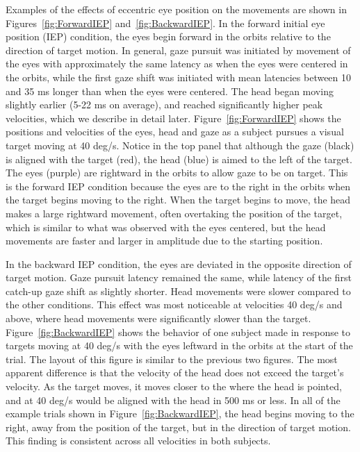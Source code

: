 \documentclass[12pt]{article}
\begin{document}
Examples of the effects of eccentric eye position on the movements are shown in Figures~\ref{fig:ForwardIEP} and~\ref{fig:BackwardIEP}. In the forward initial eye position (IEP) condition, the eyes begin forward in the orbits relative to the direction of target motion. In general, gaze pursuit was initiated by movement of the eyes with approximately the same latency as when the eyes were centered in the orbits, while the first gaze shift was initiated with mean latencies between 10 and 35 ms longer than when the eyes were centered. The head began moving slightly earlier (5-22 ms on average), and reached significantly higher peak velocities, which we describe in detail later. Figure~\ref{fig:ForwardIEP} shows the positions and velocities of the eyes, head and gaze as a subject pursues a visual target moving at 40 deg/s. Notice  in the top panel that although the gaze (black) is aligned with the target (red), the head (blue) is aimed to the left of the target. The eyes (purple) are rightward in the orbits to allow gaze to be on target. This is the forward IEP condition because the eyes are to the right in the orbits when the target begins moving to the right. When the target begins to move, the head makes a large rightward movement, often overtaking the position of the target, which is similar to what was observed with the eyes centered, but the head movements are faster and larger in amplitude due to the starting position.  

In the backward IEP condition, the eyes are deviated in the opposite direction of target motion.  Gaze pursuit latency remained the same, while latency of the first catch-up gaze shift as slightly shorter. Head movements were slower compared to the other conditions. This effect was most noticeable at velocities 40 deg/s and above, where head movements were significantly slower than the target. Figure~\ref{fig:BackwardIEP} shows the behavior of one subject made in response to targets moving at 40 deg/s with the eyes leftward in the orbits at the start of the trial. The layout of this figure is similar to the previous two figures. The most apparent difference is that the velocity of the head does not exceed the target's velocity. As the target moves, it moves closer to the where the head is pointed, and at 40 deg/s would be aligned with the head in 500 ms or less. In all of the example trials shown in Figure~\ref{fig:BackwardIEP}, the head begins moving to the right, away from the position of the target, but in the direction of target motion. This finding is consistent across all velocities in both subjects. 
\end{document}
